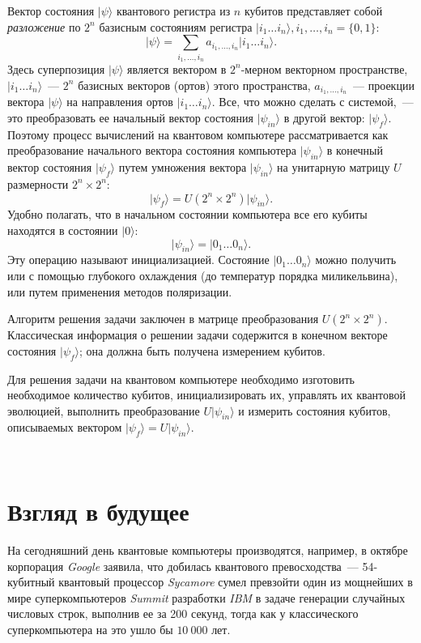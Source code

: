 \begin{multicols}{2}
{    Вектор состояния $\vert\psi\rangle$ квантового регистра из $n$ кубитов
    представляет собой \emph{разложение} по $2^n$ базисным состояниям регистра $\vert i_1 \ldots i_n \rangle, i_1, \ldots, i_n = \{0, 1\}:$
    \begin{equation}
        \vert\psi\rangle=\sum\limits_{i_1,\ldots,i_n}a_{i_1,\ldots,i_n}\vert i_1\ldots i_n\rangle.
    \end{equation}
    Здесь суперпозиция $\vert\psi\rangle$ является вектором в $2^n$-мерном векторном пространстве, \(\vert i_1\ldots i_n\rangle\)~--- $2^n$ базисных векторов (ортов) этого пространства, $a_{i_1,\ldots,i_n}$~--- проекции вектора $\vert\psi\rangle$ на направления ортов $\vert i_1 \ldots i_n \rangle$.
    Все, что можно сделать с системой,~--- это преобразовать ее начальный вектор состояния $\vert\psi_{in}\rangle$ в другой вектор: $\vert\psi_f\rangle$. Поэтому процесс вычислений на квантовом компьютере рассматривается как преобразование начального вектора состояния компьютера $\vert\psi_{in}\rangle$ в конечный вектор состояния $\vert\psi_f\rangle$ путем умножения вектора $\vert\psi_{in}\rangle$ на унитарную матрицу $U$ размерности $2^n \times 2^n$:
    \begin{equation}
        \vert\psi_f\rangle=U(2^n\times 2^n)\vert\psi_{in}\rangle.
    \end{equation}
    Удобно полагать, что в начальном состоянии компьютера все его кубиты находятся в состоянии $\vert0\rangle$:
    \begin{equation}
        \vert\psi_{in}\rangle=\vert0_1\ldots 0_n\rangle.
    \end{equation}
    Эту операцию называют инициализацией. Состояние $\vert0_1\ldots 0_n\rangle$ можно получить или с помощью глубокого охлаждения (до температур порядка миликельвина), или путем применения методов поляризации.
    
    Алгоритм решения задачи заключен в матрице преобразования $U(2^n\times 2^n).$ Классическая информация о решении задачи содержится в конечном векторе состояния $\vert\psi_f\rangle$; она должна быть получена измерением кубитов.

    Для решения задачи на квантовом компьютере необходимо изготовить необходимое количество кубитов, инициализировать их, управлять их квантовой эволюцией, выполнить преобразование $U\vert\psi_{in}\rangle$ и измерить состояния кубитов, описываемых вектором $\vert\psi_f\rangle=U\vert\psi_{in}\rangle.$
    }\\
    \section*{Взгляд в будущее}
    \normalsize{
        На сегодняшний день квантовые компьютеры производятся, например, в октябре корпорация \emph{Google} заявила, что добилась квантового превосходства~--- 54-кубитный квантовый процессор \emph{Sycamore} сумел превзойти один из мощнейших в мире суперкомпьютеров \emph{Summit} разработки \emph{IBM}
        в задаче генерации случайных числовых строк, выполнив ее за 200 секунд, тогда как у классического суперкомпьютера на это ушло бы $10~000$ лет.
        
}
\end{multicols}
